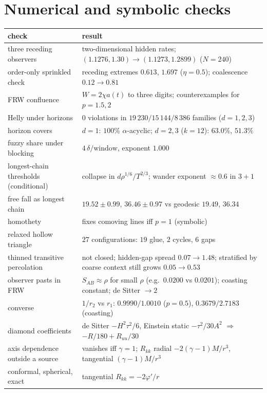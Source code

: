 \documentclass[11pt]{article}
\theoremstyle{definition}
\theoremstyle{remark}
\begin{document}
\section{Numerical and symbolic checks}\label{app:numerics}
\begin{center}\small
\begin{tabular}{p{}p{}}\toprule
check & result\\\midrule
three receding observers & two-dimensional hidden rates; $(1.1276,1.30)\to(1.1273,1.2899)$ ($N=240$)\\
order-only sprinkled check & receding extremes $0.613$, $1.697$ ($\eta=0.5$); coalescence $0.12\to0.81$\\
FRW confluence & $W=2\chi a(t)$ to three digits; counterexamples for $p=1.5,2$\\
Helly under horizons & $0$ violations in $19\,230/15\,144/8\,386$ families ($d=1,2,3$)\\
horizon covers & $d=1$: $100\%$ $\alpha$-acyclic; $d=2,3$ ($k=12$): $63.0\%$, $51.3\%$\\
fuzzy share under blocking & $4\,\delta/\text{window}$, exponent $1.000$\\
longest-chain thresholds (conditional) & collapse in $d\rho^{1/6}/T^{2/3}$; wander exponent $\approx0.6$ in $3+1$\\
free fall as longest chain & $19.52\pm0.99$, $36.46\pm0.97$ vs geodesic $19.49$, $36.34$\\
homothety & fixes comoving lines iff $p=1$ (symbolic)\\
relaxed hollow triangle & $27$ configurations: $19$ glue, $2$ cycles, $6$ gaps\\
thinned transitive percolation & not closed; hidden-gap spread $0.07\to1.48$; stratified by coarse context still grows $0.05\to0.53$\\
observer pasts in FRW & $S_{AB}\approx\rho$ for small $\rho$ (e.g.\ $0.0200$ vs $0.0201$); coasting constant; de Sitter $\to2$\\
converse & $1/r_2$ vs $r_1$: $0.9990/1.0010$ ($p=0.5$), $0.3679/2.7183$ (coasting)\\
diamond coefficients & de Sitter $-H^2\tau^2/6$, Einstein static $-\tau^2/30A^2$ $\Rightarrow$ $-R/180+R_{uu}/30$\\
axis dependence outside a source & vanishes iff $\gamma=1$; $R_{kk}$ radial $-2(\gamma-1)M/r^3$, tangential $(\gamma-1)M/r^3$\\
conformal, spherical, exact & tangential $R_{kk}=-2\varphi'/r$\\

\end{tabular}
\end{center}
\end{document}
